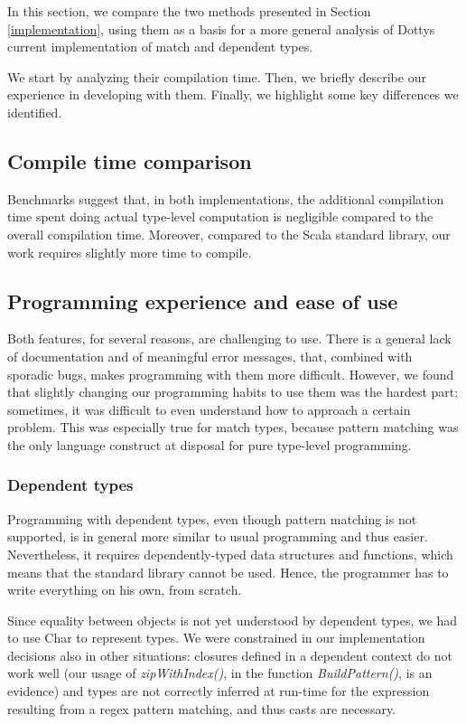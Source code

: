 In this section, we compare the two methods presented in Section \ref{implementation}, using them as a basis for a more general analysis of Dotty\textquotesingle s current implementation of match and dependent types.

We start by analyzing their compilation time. Then, we briefly describe our experience in developing with them. Finally, we highlight some key differences we identified.

\subsection{Compile time comparison}

Benchmarks suggest that, in both implementations, the additional compilation time spent doing actual type-level computation is negligible compared to the overall compilation time. Moreover, compared to the Scala standard library, our work requires slightly more time to compile.

\subsection{Programming experience and ease of use}
Both features, for several reasons, are challenging to use. There is a general lack of documentation and of meaningful error messages, that, combined with sporadic bugs, makes programming with them more difficult. However, we found that slightly changing our programming habits to use them was the hardest part; sometimes, it was difficult to even understand how to approach a certain problem. This was especially true for match types, because pattern matching was the only language construct at disposal for pure type-level programming.

\subsubsection{Dependent types}

Programming with dependent types, even though pattern matching is not supported, is in general more similar to usual programming and thus easier. Nevertheless, it requires dependently-typed data structures and functions, which means that the standard library cannot be used. Hence, the programmer has to write everything on his own, from scratch. 

Since equality between objects is not yet understood by dependent types, we had to use Char to represent types. We were constrained in our implementation decisions also in other situations: closures defined in a dependent context do not work well (our usage of \textit{zipWithIndex()}, in the function \textit{BuildPattern()}, is an evidence) and types are not correctly inferred at run-time for the expression resulting from a regex pattern matching, and thus casts are necessary.

